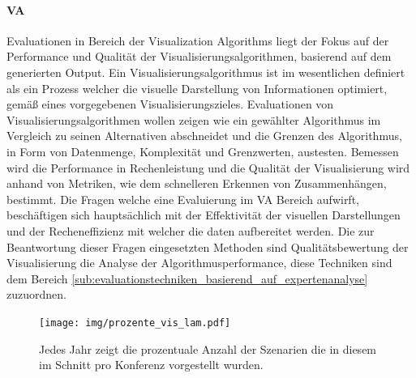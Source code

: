 \documentclass[draft=false
              ,paper=a4
              ,twoside=false
              ,fontsize=11pt
              ,headsepline
              ,BCOR10mm
              ,DIV11
              ]{scrbook}
\begin{document}
 \paragraph{VA} %
 \label{par:va}
 Evaluationen in Bereich der Visualization Algorithms liegt der Fokus auf der Performance und Qualität der Visualisierungsalgorithmen, basierend auf dem generierten Output. Ein Visualisierungsalgorithmus ist im wesentlichen definiert als ein Prozess welcher die visuelle Darstellung von Informationen optimiert, gemäß eines vorgegebenen Visualisierungszieles. Evaluationen von Visualisierungsalgorithmen wollen zeigen wie ein gewählter Algorithmus im Vergleich zu seinen Alternativen abschneidet und die Grenzen des Algorithmus, in Form von Datenmenge, Komplexität und Grenzwerten, austesten. Bemessen wird die Performance in Rechenleistung und die Qualität der Visualisierung wird anhand von Metriken, wie dem schnelleren Erkennen von Zusammenhängen, bestimmt. Die Fragen welche eine Evaluierung im VA Bereich aufwirft, beschäftigen sich hauptsächlich mit der Effektivität der visuellen Darstellungen und der Recheneffizienz mit welcher die daten aufbereitet werden. Die zur Beantwortung dieser Fragen eingesetzten Methoden sind Qualitätsbewertung der Visualisierung die Analyse der Algorithmusperformance, diese Techniken sind dem Bereich \ref{sub:evaluationstechniken_basierend_auf_expertenanalyse}  zuzuordnen. 

\begin{figure}[htbp]
  \centering
  \texttt{[image: img/prozente\_vis\_lam.pdf]}
  \caption{Jedes Jahr zeigt die prozentuale Anzahl der Szenarien die in diesem im Schnitt pro Konferenz vorgestellt wurden.}
  \label{fig:szenarien}
\end{figure}
\end{document}

